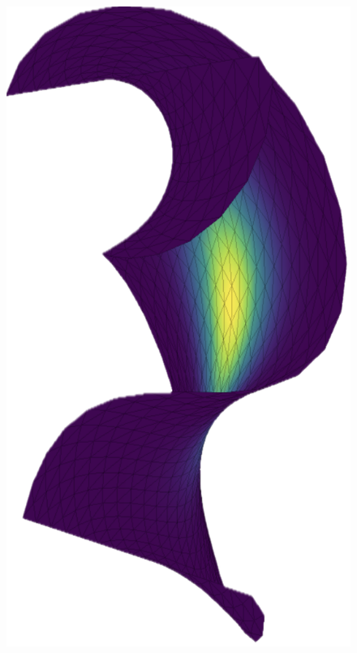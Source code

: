 \begin{figure}[!h]
    \hspace*{20mm}\includegraphics[width=0.8\columnwidth]{../images/helix_force.png}\vspace*{-50mm}

\end{figure}
